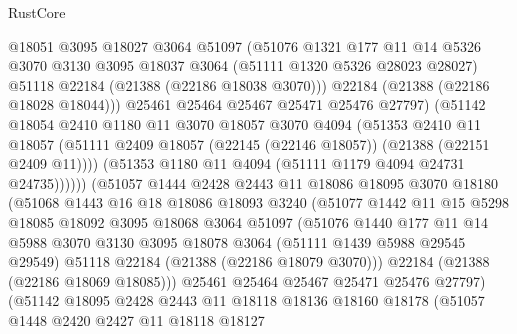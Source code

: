 \begin{lexlean}{RustCore}
\begin{coremodule}
                  @18051
                  @3095
                  @18027
                  @3064
                  @51097
                  (@51076
                    @1321
                    @177
                    @11
                    @14
                    @5326
                    @3070
                    @3130
                    @3095
                    @18037
                    @3064
                    (@51111 @1320 @5326 @28023 @28027)
                    @51118
                    @22184
                    (@21388 (@22186 @18038 @3070)))
                  @22184
                  (@21388 (@22186 @18028 @18044)))
                @25461
                @25464
                @25467
                @25471
                @25476
                @27797)
              (@51142
                @18054
                @2410
                @1180
                @11
                @3070
                @18057
                @3070
                @4094
                (@51353
                  @2410
                  @11
                  @18057
                  (@51111 @2409 @18057 (@22145 (@22146 @18057)) (@21388 (@22151 @2409 @11))))
                (@51353 @1180 @11 @4094 (@51111 @1179 @4094 @24731 @24735))))))
        (@51057
          @1444
          @2428
          @2443
          @11
          @18086
          @18095
          @3070
          @18180
          (@51068
            @1443
            @16
            @18
            @18086
            @18093
            @3240
            (@51077
              @1442
              @11
              @15
              @5298
              @18085
              @18092
              @3095
              @18068
              @3064
              @51097
              (@51076
                @1440
                @177
                @11
                @14
                @5988
                @3070
                @3130
                @3095
                @18078
                @3064
                (@51111 @1439 @5988 @29545 @29549)
                @51118
                @22184
                (@21388 (@22186 @18079 @3070)))
              @22184
              (@21388 (@22186 @18069 @18085)))
            @25461
            @25464
            @25467
            @25471
            @25476
            @27797)
          (@51142
            @18095
            @2428
            @2443
            @11
            @18118
            @18136
            @18160
            @18178
            (@51057
              @1448
              @2420
              @2427
              @11
              @18118
              @18127

\end{coremodule}
\end{lexlean}
